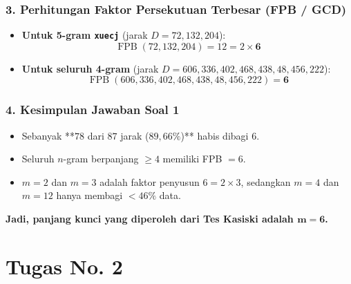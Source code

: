 \documentclass[11pt,a4paper]{article}
\begin{document}
\subsubsection*{3. Perhitungan Faktor Persekutuan Terbesar (FPB / GCD)}
\begin{itemize}[leftmargin=*]
    \item \textbf{Untuk 5-gram \texttt{xuecj}} (jarak $D = 72, 132, 204$):
    $$\operatorname{FPB}(72, 132, 204) = 12 = 2 \times \mathbf{6}$$
    \item \textbf{Untuk seluruh 4-gram} (jarak $D = 606, 336, 402, 468, 438, 48, 456, 222$):
    $$\operatorname{FPB}(606, 336, 402, 468, 438, 48, 456, 222) = \mathbf{6}$$
\end{itemize}

\subsubsection*{4. Kesimpulan Jawaban Soal 1}
\begin{tcolorbox}
\begin{itemize}[leftmargin=*, noitemsep]
    \item Sebanyak **$78$ dari $87$ jarak ($89{,}66\%$)** habis dibagi 6.
    \item Seluruh $n$-gram berpanjang $\ge 4$ memiliki FPB $= 6$.
    \item $m=2$ dan $m=3$ adalah faktor penyusun $6 = 2 \times 3$, sedangkan $m=4$ dan $m=12$ hanya membagi $<46\%$ data.
\end{itemize}
\textbf{Jadi, panjang kunci yang diperoleh dari Tes Kasiski adalah $\mathbf{m = 6}$.}
\end{tcolorbox}

\newpage

\section*{Tugas No. 2}
\end{document}
